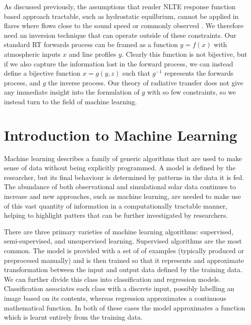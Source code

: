 As discussed previously, the assumptions that render NLTE response function based approach tractable, such as hydrostatic equilbrium, cannot be applied in flares where flows close to the sound speed or commonly observed \NeedRef{}.
We therefore need an inversion technique that can operate outside of these constraints.
Our standard RT forwards process can be framed as a function $y = f(x)$ with atmospheric inputs $x$ and line profiles $y$.
Clearly this function is not bijective, but if we also capture the information lost in the forward process, we can instead define a bijective function $x = g(y, z)$ such that $g^{-1}$ represents the forwards process, and $g$ the inverse process.
Our theory of radiative transfer does not give any immediate insight into the formulation of $g$ with so few constraints, so we instead turn to the field of machine learning.

\section{Introduction to Machine Learning}

Machine learning describes a family of generic algorithms that are used to make sense of data without being explicitly programmed.
A model is defined by the researcher, but its final behaviour is determined by patterns in the data it is fed.
The abundance of both observational and simulational solar data continues to increase and new approaches, such as machine learning, are needed to make use of this vast quantity of information in a computationally tractable manner, helping to highlight patters that can be further investigated by researchers.

There are three primary varieties of machine learning algorithms: supervised, semi-supervised, and unsupervised learning.
Supervised algorithms are the most common.
The model is provided with a set of of examples (typically produced or preprocesed manually) and is then trained so that it represents and approximate transformation between the input and output data defined by the training data.
We can further divide this class into classification and regression models.
Classification associates each class with a discrete input, possibly labelling an image based on its contents, whereas regression approximates a continuous mathematical function.
In both of these cases the model approximates a function which is learnt entirely from the training data.

